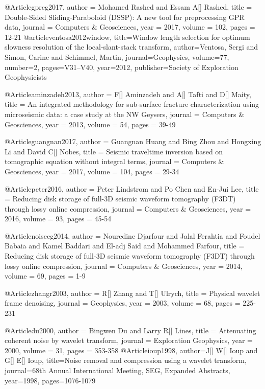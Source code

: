 @Article{gprcg2017,
  author = 	 {Mohamed Rashed and Essam A[] Rashed},
  title = 	 {Double-Sided Sliding-Paraboloid (DSSP): A new tool for preprocessing GPR data},
  journal = 	 { Computers \& Geosciences},
  year = 	 2017,
  volume = 	 102,
  pages = 	 {12-21}}
@article{ventosa2012window,
  title={Window length selection for optimum slowness resolution of the local-slant-stack transform},
  author={Ventosa, Sergi and Simon, Carine and Schimmel, Martin},
  journal={Geophysics},
  volume={77},
  number={2},
  pages={V31--V40},
  year={2012},
  publisher={Society of Exploration Geophysicists}
}

@Article{aminzadeh2013,
  author = 	 {F[] Aminzadeh and A[] Tafti and D[] Maity},
  title = 	 {An integrated methodology for sub-surface fracture characterization using microseismic data: a case study at the NW {G}eysers},
  journal = 	 { Computers \& Geosciences},
  year = 	 2013,
  volume = 	 54,
  pages = 	 {39-49}}
  
 @Article{guangnan2017,
  author = 	 {Guangnan Huang and Bing Zhou and Hongxing Li and David C[] Nobes},
  title = 	 {Seismic traveltime inversion based on tomographic equation without integral terms},
  journal = 	 { Computers \& Geosciences},
  year = 	 2017,
  volume = 	 104,
  pages = 	 {29-34}} 

 @Article{peter2016,
  author = 	 {Peter Lindstrom and Po Chen and En-Jui Lee},
  title = 	 {Reducing disk storage of full-3{D} seismic waveform tomography ({F3DT}) through lossy online compression},
  journal = 	 { Computers \& Geosciences},
  year = 	 2016,
  volume = 	 93,
  pages = 	 {45-54}} 
  
 @Article{noisecg2014,
  author = 	 {Nouredine Djarfour and Jalal Ferahtia and Foudel Babaia and Kamel Baddari and El-adj Said and Mohammed Farfour},
  title = 	 {Reducing disk storage of full-3{D} seismic waveform tomography (F3DT) through lossy online compression},
  journal = 	 { Computers \& Geosciences},
  year = 	 2014,
  volume = 	 69,
  pages = 	 {1-9}} 
  


@Article{zhangr2003,
  author = 	 {R[] Zhang and T[] Ulrych},
  title = 	 {Physical wavelet frame denoising},
  journal = 	 {Geophysics},
  year = 	 2003,
  volume = 	 68,
  pages = 	 {225-231}}

@Article{du2000,
  author = 	 {Bingwen Du and Larry R[] Lines},
  title = 	 {Attenuating coherent noise by wavelet transform},
  journal = 	 {Exploration Geophysics},
  year = 	 2000,
  volume = 	 31,
  pages = 	 {353-358}}
@Article{ioup1998,
  author={J[] W[] Ioup and G[] E[] Ioup},
  title={Noise removal and compression using a wavelet transform},
  journal={68th Annual International Meeting, SEG, Expanded Abstracts},
  year=1998,
  pages={1076-1079}
}

